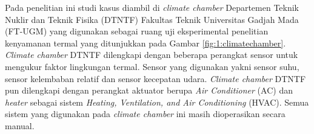 


Pada penelitian ini studi kasus diambil di \textit{climate chamber} Departemen Teknik Nuklir dan Teknik Fisika (DTNTF) Fakultas Teknik Universitas Gadjah Mada (FT-UGM) yang digunakan sebagai ruang uji eksperimental penelitian kenyamanan termal yang ditunjukkan pada Gambar \ref{fig:1:climatechamber}. \textit{Climate chamber} DTNTF dilengkapi dengan beberapa perangkat sensor untuk mengukur faktor lingkungan termal. Sensor yang digunakan yakni sensor suhu, sensor kelembaban relatif dan sensor kecepatan udara. \textit{Climate chamber} DTNTF pun dilengkapi dengan perangkat aktuator berupa \textit{Air Conditioner} (AC) dan \textit{heater} sebagai sistem \textit{Heating, Ventilation, and Air Conditioning} (HVAC). Semua sistem yang digunakan pada \textit{climate chamber} ini masih dioperasikan secara manual.

